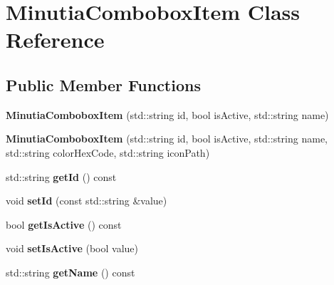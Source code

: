 \hypertarget{class_minutia_combobox_item}{}\section{Minutia\+Combobox\+Item Class Reference}
\label{class_minutia_combobox_item}
\subsection*{Public Member Functions}
\begin{DoxyCompactItemize}
\item 
\mbox{\label{class_minutia_combobox_item_a082c0380426802f8d8ac9e13a0741950}} 
{\bfseries Minutia\+Combobox\+Item} (std\+::string id, bool is\+Active, std\+::string name)
\item 
\mbox{\label{class_minutia_combobox_item_a1ca5d5c7505aef2a16ab8b90e159ab93}} 
{\bfseries Minutia\+Combobox\+Item} (std\+::string id, bool is\+Active, std\+::string name, std\+::string color\+Hex\+Code, std\+::string icon\+Path)
\item 
\mbox{\label{class_minutia_combobox_item_afd0912ee65bec95b26b88845b5392aed}} 
std\+::string {\bfseries get\+Id} () const
\item 
\mbox{\label{class_minutia_combobox_item_a9205282035a41bf6b1e75f37dad75789}} 
void {\bfseries set\+Id} (const std\+::string \&value)
\item 
\mbox{\label{class_minutia_combobox_item_a565c222322bd7bdc589d71b50a6519e1}} 
bool {\bfseries get\+Is\+Active} () const
\item 
\mbox{\label{class_minutia_combobox_item_a276511d8799ae075e66df7e8572037fd}} 
void {\bfseries set\+Is\+Active} (bool value)
\item 
\mbox{\label{class_minutia_combobox_item_acd1e60fe4cc6ec68889586b61ba2a130}} 
std\+::string {\bfseries get\+Name} () const
\item 
\mbox{\label{class_minutia_combobox_item_ad9b79c953aadab9ccfa0253ceaaef8ba}} 

\end{DoxyCompactItemize}
